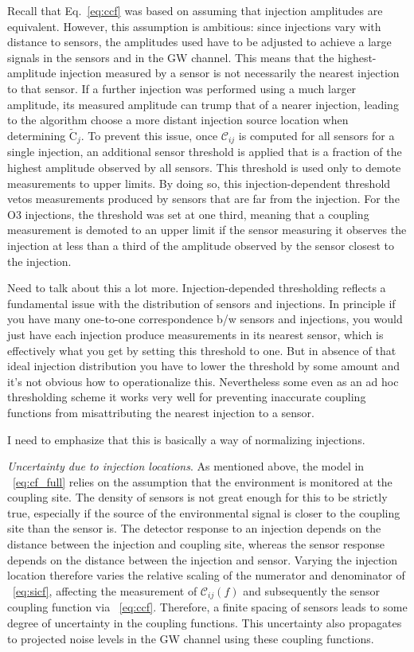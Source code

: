Recall that Eq.~\ref{eq:ccf} was based on assuming that injection amplitudes are equivalent.
However, this assumption is ambitious: since injections vary with distance to sensors, the amplitudes used have to be adjusted to achieve a large signals in the sensors and in the \ac{GW} channel.
This means that the highest-amplitude injection measured by a sensor is not necessarily the nearest injection to that sensor.
If a further injection was performed using a much larger amplitude, its measured amplitude can trump that of a nearer injection, leading to the algorithm choose a more distant injection source location when determining $\widetilde{\mathrm{C}}_j$.
To prevent this issue, once $\mathcal{C}_{ij}$ is computed for all sensors for a single injection, an additional sensor threshold is applied that is a fraction of the highest amplitude observed by all sensors.
This threshold is used only to demote measurements to upper limits.
By doing so, this injection-dependent threshold vetos measurements produced by sensors that are far from the injection.
For the \ac{O3} injections, the threshold was set at one third, meaning that a coupling measurement is demoted to an upper limit if the sensor measuring it observes the injection at less than a third of the amplitude observed by the sensor closest to the injection.

{\color{red}
Need to talk about this a lot more.
Injection-depended thresholding reflects a fundamental issue with the distribution of sensors and injections.
In principle if you have many one-to-one correspondence b/w sensors and injections,
you would just have each injection produce measurements in its nearest sensor, which is effectively what you get by setting this threshold to one.
But in absence of that ideal injection distribution you have to lower the threshold by some amount and it's not obvious how to operationalize this.
Nevertheless some even as an ad hoc thresholding scheme it works very well for preventing inaccurate coupling functions from misattributing the nearest injection to a sensor.

I need to emphasize that this is basically a way of normalizing injections.}

\textit{Uncertainty due to injection locations}.
As mentioned above, the model in ~\cref{eq:cf_full} relies on the assumption that the environment is monitored at the coupling site.
The density of sensors is not great enough for this to be strictly true, especially if the source of the environmental signal is closer to the coupling site than the sensor is.
The detector response to an injection depends on the distance between the injection and coupling site, whereas the sensor response depends on the distance between the injection and sensor.
Varying the injection location therefore varies the relative scaling of the numerator and denominator of ~\cref{eq:sicf}, affecting the measurement of $\mathcal{C}_{ij}(f)$ and subsequently the sensor coupling function via ~\cref{eq:ccf}.
Therefore, a finite spacing of sensors leads to some degree of uncertainty in the coupling functions.
This uncertainty also propagates to projected noise levels in the \ac{GW} channel using these coupling functions.

